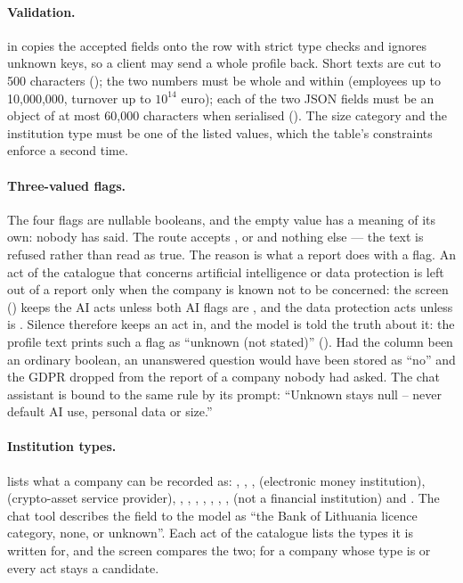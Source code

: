 \paragraph{Validation.}  in  copies
the accepted fields onto the row with strict type checks and ignores unknown keys, so a client
may send a whole profile back. Short texts are cut to 500 characters ();
the two numbers must be whole and within  (employees up to 10,000,000,
turnover up to $10^{14}$ euro); each of the two JSON fields must be an object of at most
60,000 characters when serialised (). The size category and the
institution type must be one of the listed values, which the table's  constraints
enforce a second time.

\paragraph{Three-valued flags.} The four flags are nullable booleans, and the empty value has
a meaning of its own: nobody has said. The route accepts ,  or
 and nothing else --- the text  is refused rather than read as true.
The reason is what a report does with a flag. An act of the catalogue that concerns artificial
intelligence or data protection is left out of a report only when the company is known not to
be concerned: the screen () keeps the AI acts unless both AI flags are
, and the data protection acts unless  is
. Silence therefore keeps an act in, and the model is told the truth about it: the
profile text prints such a flag as \enquote{unknown (not stated)} (). Had the
column been an ordinary boolean, an unanswered question would have been stored as \enquote{no}
and the GDPR dropped from the report of a company nobody had asked. The chat assistant is
bound to the same rule by its prompt: \enquote{Unknown stays null -- never default AI use,
personal data or size.}

\paragraph{Institution types.}  lists what a company can be recorded
as: , , ,  (electronic money
institution),  (crypto-asset service provider), ,
, , ,
, , ,  (not a financial
institution) and . The chat tool describes the field to the model as
\enquote{the Bank of Lithuania licence category, none, or unknown}. Each act of the catalogue
lists the types it is written for, and the screen compares the two; for a company whose type
is  or  every act stays a candidate.

